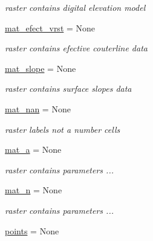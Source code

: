 \begin{DoxyCompactItemize}
\begin{DoxyCompactList}\small\item\em raster contains digital elevation model \end{DoxyCompactList}\item 
\hypertarget{namespacesmoderp2d_1_1glob_a39559a7d2c4ebfa74ba2fa8c333558c5}{\hyperlink{namespacesmoderp2d_1_1glob_a39559a7d2c4ebfa74ba2fa8c333558c5}{mat\-\_\-efect\-\_\-vrst} = None}\label{namespacesmoderp2d_1_1glob_a39559a7d2c4ebfa74ba2fa8c333558c5}

\begin{DoxyCompactList}\small\item\em raster contains efective couterline data \end{DoxyCompactList}\item 
\hypertarget{namespacesmoderp2d_1_1glob_ac2adcb29735df1b1e800216d1188e7eb}{\hyperlink{namespacesmoderp2d_1_1glob_ac2adcb29735df1b1e800216d1188e7eb}{mat\-\_\-slope} = None}\label{namespacesmoderp2d_1_1glob_ac2adcb29735df1b1e800216d1188e7eb}

\begin{DoxyCompactList}\small\item\em raster contains surface slopes data \end{DoxyCompactList}\item 
\hypertarget{namespacesmoderp2d_1_1glob_a55e14881508d1f1e3c06321c4b0d1fce}{\hyperlink{namespacesmoderp2d_1_1glob_a55e14881508d1f1e3c06321c4b0d1fce}{mat\-\_\-nan} = None}\label{namespacesmoderp2d_1_1glob_a55e14881508d1f1e3c06321c4b0d1fce}

\begin{DoxyCompactList}\small\item\em raster labels not a number cells \end{DoxyCompactList}\item 
\hyperlink{namespacesmoderp2d_1_1glob_af861b29b2e42b3c3b67d16c4c0a70936}{mat\-\_\-a} = None
\begin{DoxyCompactList}\small\item\em raster contains parameters ... \end{DoxyCompactList}\item 
\hyperlink{namespacesmoderp2d_1_1glob_a374271c83af8083fa6a1b0f349f0b0bd}{mat\-\_\-n} = None
\begin{DoxyCompactList}\small\item\em raster contains parameters ... \end{DoxyCompactList}\item 
\hypertarget{namespacesmoderp2d_1_1glob_a12bad092ed343ad2400f374114f82237}{\hyperlink{namespacesmoderp2d_1_1glob_a12bad092ed343ad2400f374114f82237}{points} = None}\label{namespacesmoderp2d_1_1glob_a12bad092ed343ad2400f374114f82237}


\end{DoxyCompactItemize}
